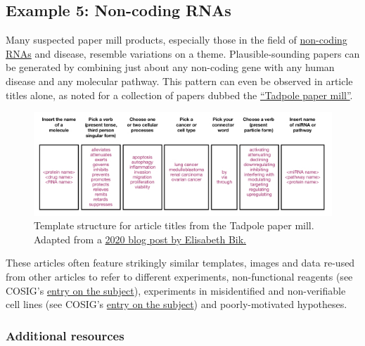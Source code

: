 \documentclass[letterpaper, 12pt]{article}
\begin{document}
\subsection*{Example 5: Non-coding RNAs}

Many suspected paper mill products, especially those in the field of \href{https://en.wikipedia.org/wiki/Non-coding_RNA}{non-coding RNAs} and disease, resemble variations on a theme. Plausible-sounding papers can be generated by combining just about any non-coding gene with any human disease and any molecular pathway. This pattern can even be observed in article titles alone, as noted for a collection of papers dubbed the \href{https://scienceintegritydigest.com/2020/02/21/the-tadpole-paper-mill/}{``Tadpole paper mill''}.

\begin{figure}[h!tbp]
    \centering
    \includegraphics[width=\textwidth]{img/formulaic/tadpole-template.jpg}
    \caption*{Template structure for article titles from the Tadpole paper mill. Adapted from a \href{https://scienceintegritydigest.com/2020/02/21/the-tadpole-paper-mill/}{2020 blog post by Elisabeth Bik.}}
\end{figure}

These articles often feature strikingly similar templates, images and data re-used from other articles to refer to different experiments, non-functional reagents (see COSIG's \href{https://osf.io/2egvz}{entry on the subject}), experiments in misidentified and non-verifiable cell lines (see COSIG's \href{https://osf.io/d7we5}{entry on the subject}) and poorly-motivated hypotheses.

\subsubsection*{Additional resources}
\end{document}
